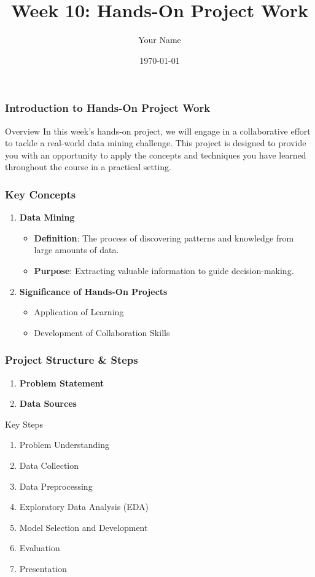 \documentclass{beamer}
\title{Week 10: Hands-On Project Work}
\author{Your Name}
\institute{Your Institution}
\date{\today}
\begin{document}
\frame{\titlepage}

\begin{frame}[fragile]
    \frametitle{Introduction to Hands-On Project Work}
    \begin{block}{Overview}
        In this week's hands-on project, we will engage in a collaborative effort to tackle a real-world data mining challenge. This project is designed to provide you with an opportunity to apply the concepts and techniques you have learned throughout the course in a practical setting.
    \end{block}
\end{frame}

\begin{frame}[fragile]
    \frametitle{Key Concepts}
    \begin{enumerate}
        \item \textbf{Data Mining}
            \begin{itemize}
                \item \textbf{Definition}: The process of discovering patterns and knowledge from large amounts of data.
                \item \textbf{Purpose}: Extracting valuable information to guide decision-making.
            \end{itemize}
        \item \textbf{Significance of Hands-On Projects}
            \begin{itemize}
                \item Application of Learning
                \item Development of Collaboration Skills
            \end{itemize}
    \end{enumerate}
\end{frame}

\begin{frame}[fragile]
    \frametitle{Project Structure & Steps}
    \begin{enumerate}
        \item \textbf{Problem Statement}
        \item \textbf{Data Sources}
    \end{enumerate}
    
    \begin{block}{Key Steps}
        \begin{enumerate}
            \item Problem Understanding
            \item Data Collection
            \item Data Preprocessing
            \item Exploratory Data Analysis (EDA)
            \item Model Selection and Development
            \item Evaluation
            \item Presentation
        \end{enumerate}
    \end{block}
\end{frame}
\end{document}
